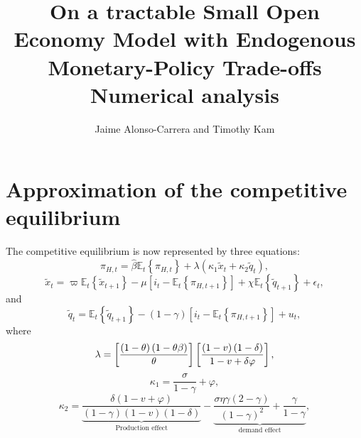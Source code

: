 \documentclass{article}
\begin{document}
\title{On a tractable Small Open Economy Model with Endogenous
Monetary-Policy Trade-offs\vspace{1.5cm}\\
Numerical analysis\vspace{1.5cm}}
\author{Jaime Alonso-Carrera and Timothy Kam}
\maketitle

\newpage

\section{Approximation of the competitive equilibrium}

The competitive equilibrium is now represented by three equations:%
\begin{equation}
\pi _{H,t}=\widehat{\beta }\mathbb{E}_{t}\left\{ \pi _{H,t}\right\} +\lambda
\left( \kappa _{1}\widetilde{x}_{t}+\kappa _{2}\widetilde{q}_{t}\right) ,
\label{Phillips}
\end{equation}%
\begin{equation}
\widetilde{x}_{t}=\varpi \mathbb{E}_{t}\left\{ \widetilde{x}_{t+1}\right\}
-\mu \left[ i_{t}-\mathbb{E}_{t}\left\{ \pi _{H,t+1}\right\} \right] +\chi 
\mathbb{E}_{t}\left\{ \widetilde{q}_{t+1}\right\} +\epsilon _{t},
\label{is equation}
\end{equation}%
and 
\begin{equation}
\widetilde{q}_{t}=\mathbb{E}_{t}\left\{ \widetilde{q}_{t+1}\right\} -\left(
1-\gamma \right) \left[ i_{t}-\mathbb{E}_{t}\left\{ \pi _{H,t+1}\right\} %
\right] +u_{t},  \label{exchange dynamics}
\end{equation}%
where%
\begin{equation*}
\lambda =\left[ \frac{\left( 1-\theta \right) \left( 1-\theta \beta \right) 
}{\theta }\right] \left[ \frac{\left( 1-v\right) \left( 1-\delta \right) }{%
1-v+\delta \varphi }\right] ,
\end{equation*}%
\begin{equation*}
\kappa _{1}=\frac{\sigma }{1-\gamma }+\varphi ,
\end{equation*}%
\begin{equation*}
\kappa _{2}=\underset{\text{Production effect}}{\underbrace{\frac{\delta
(1-v+\varphi )}{\left( 1-\gamma \right) \left( 1-v\right) (1-\delta )}}}-%
\underset{\text{demand effect}}{\underbrace{\frac{\sigma \eta \gamma \left(
2-\gamma \right) }{\left( 1-\gamma \right) ^{2}}+\frac{\gamma }{1-\gamma }}},
\end{equation*}%
\end{document}
